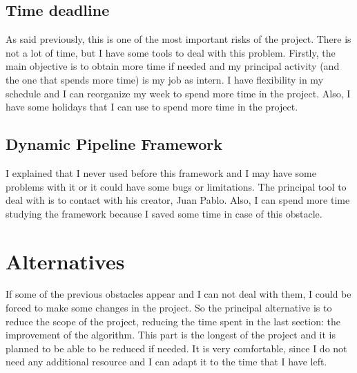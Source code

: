 \subsection*{Time deadline}
As said previously, this is one of the most important risks of the project. There is not a lot of time, but I have some tools to deal with this problem.
Firstly, the main objective is to obtain more time if needed and my principal activity (and the one that spends more time) is my job as intern.
I have flexibility in my schedule and I can reorganize my week to spend more time in the project.
Also, I have some holidays that I can use to spend more time in the project.
\subsection*{Dynamic Pipeline Framework}
I explained that I never used before this framework and I may have some problems with it or it could have some bugs or limitations.
The principal tool to deal with is to contact with his creator, Juan Pablo. Also, I can spend more time studying the framework because I saved some time in case of this obstacle.

\section{Alternatives}
If some of the previous obstacles appear and I can not deal with them, I could be forced to make some changes in the project.
So the principal alternative is to reduce the scope of the project, reducing the time spent in the last section: the improvement of the algorithm.
This part is the longest of the project and it is planned to be able to be reduced if needed.
It is very comfortable, since I do not need any additional resource and I can adapt it to the time that I have left.
